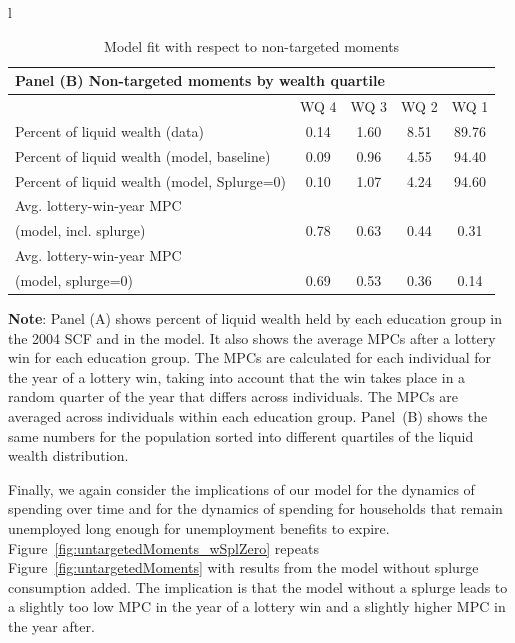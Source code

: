 \begin{table}[th]
\begin{center}
\begin{tabular}{l}
			\begin{tabular}{lcccc}
				\multicolumn{5}{l}{Panel (B) Non-targeted moments by wealth quartile} \\ \midrule
				& WQ 4 & WQ 3 & WQ 2 & WQ 1 \\ \midrule
				Percent of liquid wealth (data) & 0.14 & 1.60 & 8.51 & 89.76 \\
				Percent of liquid wealth (model, baseline) & 0.09 & 0.96 & 4.55 & 94.40 \\
				Percent of liquid wealth (model, Splurge=0) & 0.10 & 1.07 & 4.24 & 94.60 \\
				Avg. lottery-win-year MPC \\ (model, incl. splurge) & 0.78 & 0.63 & 0.44 & 0.31 \\
				Avg. lottery-win-year MPC \\ (model, splurge=0) & 0.69 & 0.53 & 0.36 & 0.14
				\\ \bottomrule 
			\end{tabular}
		\end{tabular}
		\caption{Model fit with respect to non-targeted moments}
		\label{tab:nonTargetedMoments_wSplZero}
		\parbox{16cm}{\small \vspace{.15cm} \textbf{Note}: Panel (A) shows percent of liquid wealth held by each education group in the 2004 SCF and in the model.
It also shows the average MPCs after a lottery win for each education group.
The MPCs are calculated for each individual for the year of a lottery win, taking into account that the win takes place in a random quarter of the year that differs across individuals.
The MPCs are averaged across individuals within each education group.
Panel~(B) shows the same numbers for the population sorted into different quartiles of the liquid wealth distribution.\normalsize}
	\end{center}
\end{table}



Finally, we again consider the  implications of our model for the dynamics of spending over time and for the dynamics of spending for households that remain unemployed long enough for unemployment benefits to expire.
Figure~\ref{fig:untargetedMoments_wSplZero} repeats Figure~\ref{fig:untargetedMoments} with results from the model without splurge consumption added.
The implication is that the model without a splurge leads to a slightly too low MPC in the year of a lottery win and a slightly higher MPC in the year after.


